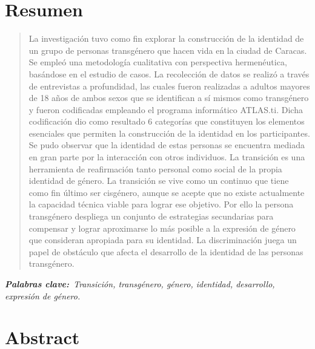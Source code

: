 \chapter{Resumen}

\begin{quote}
La investigación tuvo como fin explorar la construcción de la identidad de un
grupo de personas transgénero que hacen vida en la ciudad de Caracas. Se empleó
una metodología cualitativa con perspectiva hermenéutica, basándose en el
estudio de casos. La recolección de datos se realizó a través de entrevistas a
profundidad, las cuales fueron realizadas a adultos mayores de 18 años de ambos
sexos que se identifican a sí mismos como transgénero y fueron codificadas
empleando el programa informático ATLAS.ti\@. Dicha codificación dio como
resultado 6 categorías que constituyen los elementos esenciales que permiten la
construcción de la identidad en los participantes. Se pudo observar que la
identidad de estas personas se encuentra mediada en gran parte por la
interacción con otros individuos. La transición es una herramienta de
reafirmación tanto personal como social de la propia identidad de género. La
transición se vive como un continuo que tiene como fin último ser cisgénero,
aunque se acepte que no existe actualmente la capacidad técnica viable para
lograr ese objetivo. Por ello la persona transgénero despliega un conjunto de
estrategias secundarias para compensar y lograr aproximarse lo más posible a la
expresión de género que consideran apropiada para su identidad. La
discriminación juega un papel de obstáculo que afecta el desarrollo de la
identidad de las personas transgénero.
\end{quote}

\itshape\textbf{Palabras clave:}\normalfont{}\ Transición, transgénero,
género, identidad, desarrollo, expresión de género.

\chapter{Abstract}

\begin{center}
	\large\scshape\theengtitle\
\end{center}

